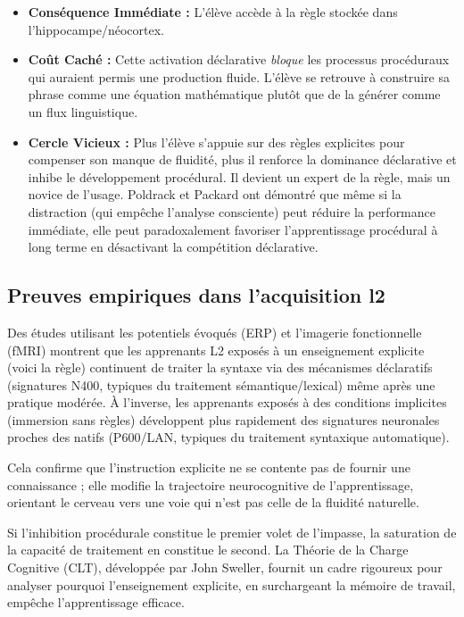 \begin{itemize}\item \textbf{Conséquence Immédiate :} L'élève accède à la règle stockée dans l'hippocampe/néocortex.\item \textbf{Coût Caché :} Cette activation déclarative \textit{bloque} les processus procéduraux qui auraient permis une production fluide. L'élève se retrouve à \og construire\fg{} sa phrase comme une équation mathématique plutôt que de la \og générer\fg{} comme un flux linguistique.\cite{II-2-2-ref11}\item \textbf{Cercle Vicieux :} Plus l'élève s'appuie sur des règles explicites pour compenser son manque de fluidité, plus il renforce la dominance déclarative et inhibe le développement procédural. Il devient un expert de la règle, mais un novice de l'usage. Poldrack et Packard ont démontré que même si la distraction (qui empêche l'analyse consciente) peut réduire la performance immédiate, elle peut paradoxalement favoriser l'apprentissage procédural à long terme en \og désactivant\fg{} la compétition déclarative.\cite{II-2-2-ref15}\end{itemize}

\subsection{Preuves empiriques dans l'acquisition l2}

Des études utilisant les potentiels évoqués (ERP) et l'imagerie fonctionnelle (fMRI) montrent que
les apprenants L2 exposés à un enseignement explicite (\og voici la règle\fg{}) continuent de
traiter la syntaxe via des mécanismes déclaratifs (signatures N400, typiques du traitement
sémantique/lexical) même après une pratique modérée. À l'inverse, les apprenants exposés à des
conditions implicites (immersion sans règles) développent plus rapidement des signatures neuronales
proches des natifs (P600/LAN, typiques du traitement syntaxique automatique).\cite{II-2-2-ref16}

Cela confirme que l'instruction explicite ne se contente pas de fournir une connaissance ; elle
modifie la trajectoire neurocognitive de l'apprentissage, orientant le cerveau vers une voie qui
n'est pas celle de la fluidité naturelle.

Si l'inhibition procédurale constitue le premier volet de l'impasse, la saturation de la capacité de
traitement en constitue le second. La Théorie de la Charge Cognitive (CLT), développée par John
Sweller, fournit un cadre rigoureux pour analyser pourquoi l'enseignement explicite, en surchargeant
la mémoire de travail, empêche l'apprentissage efficace.\cite{II-2-2-ref19}



